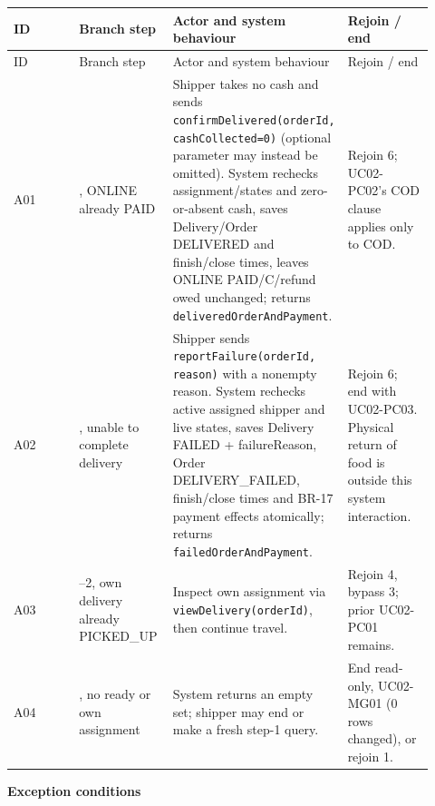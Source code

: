 \begin{longtable}{>{\raggedright\arraybackslash}p{0.2300\linewidth}>{\raggedright\arraybackslash}p{0.2300\linewidth}>{\raggedright\arraybackslash}p{0.2300\linewidth}>{\raggedright\arraybackslash}p{0.2300\linewidth}}
ID & Branch step & Actor and system behaviour & Rejoin / end \\
\hline\endfirsthead
ID & Branch step & Actor and system behaviour & Rejoin / end \\
\hline\endhead
A01 & 5, ONLINE already PAID & Shipper takes no cash and sends \texttt{confirmDelivered(orderId, cashCollected=0)} (optional parameter may instead be omitted). System rechecks assignment/states and zero-or-absent cash, saves Delivery/Order DELIVERED and finish/close times, leaves ONLINE PAID/C/refund owed unchanged; returns \texttt{deliveredOrderAndPayment}. & Rejoin 6; UC02-PC02's COD clause applies only to COD. \\
A02 & 5, unable to complete delivery & Shipper sends \texttt{reportFailure(orderId, reason)} with a nonempty reason. System rechecks active assigned shipper and live states, saves Delivery FAILED + failureReason, Order DELIVERY\_FAILED, finish/close times and BR-17 payment effects atomically; returns \texttt{failedOrderAndPayment}. & Rejoin 6; end with UC02-PC03. Physical return of food is outside this system interaction. \\
A03 & 1--2, own delivery already PICKED\_UP & Inspect own assignment via \texttt{viewDelivery(orderId)}, then continue travel. & Rejoin 4, bypass 3; prior UC02-PC01 remains. \\
A04 & 1, no ready or own assignment & System returns an empty set; shipper may end or make a fresh step-1 query. & End read-only, UC02-MG01 (0 rows changed), or rejoin 1. \\
\end{longtable}
\textbf{Exception conditions}

